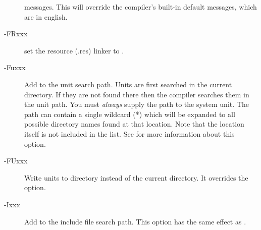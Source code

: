 \begin{description}
messages. This will override the compiler's built-in default messages, which
are in english.
\item[-FRxxx] set the resource (.res) linker to .
\item [-Fuxxx] Add  to the unit search path.
Units are first searched in the current directory.
If they are not found there then the compiler searches them in the unit path.
You must {\em always} supply the path to the system unit. The 
path can contain a single wildcard (*) which will be expanded to all
possible directory names found at that location. Note that the location
itself is not included in the list. See  for more
information about this option.
\item [-FUxxx] Write units to directory  instead of the current 
directory. It overrides the  option.
\item [-Ixxx]  Add  to the include file search path.
This option has the same effect as .
\end{description}

